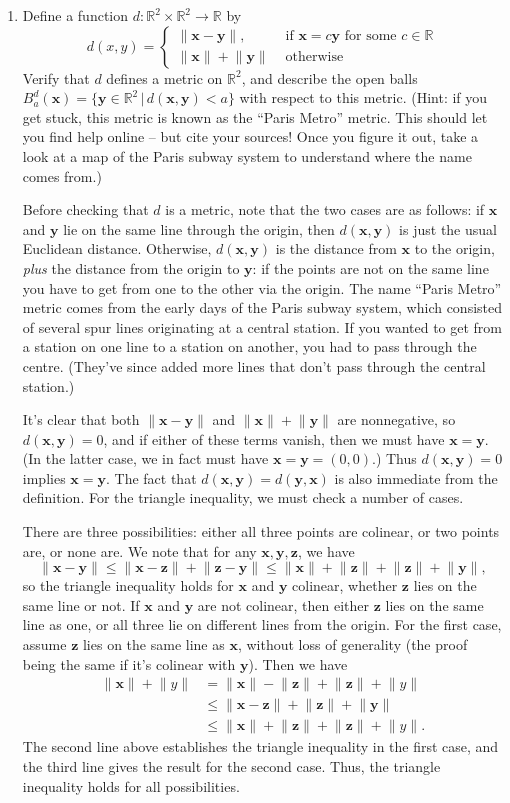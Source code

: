 \documentclass[letterpaper,12pt]{article}
\newcommand{\len}[1]{\lVert #1\rVert}
\newcommand{\R}{\mathbb{R}}
\newcommand{\x}{\mathbf{x}}
\newcommand{\y}{\mathbf{y}}
\newcommand{\z}{\mathbf{z}}
\begin{document}
\begin{enumerate}
 \item Define a function $d:\R^2\times\R^2\to \R$ by
\[
 d(x,y) = \begin{cases}
           \len{\x-\y}, & \text{ if } \x=c\y \text{ for some } c\in\R\\
           \len{\x}+\len{\y} & \text{ otherwise}
          \end{cases}
\]
Verify that $d$ defines a metric on $\R^2$, and describe the open balls $B^d_a(\x) = \{\y\in\R^2 \,|\, d(\x,\y)<a\}$ with respect to this metric. (Hint: if you get stuck, this metric is known as the ``Paris Metro'' metric. This should let you find help online -- but cite your sources! Once you figure it out, take a look at a map of the Paris subway system to understand where the name comes from.)

\bigskip

Before checking that $d$ is a metric, note that the two cases are as follows: if $\x$ and $\y$ lie on the same line through the origin, then $d(\x,\y)$ is just the usual Euclidean distance. Otherwise, $d(\x,\y)$ is the distance from $\x$ to the origin, {\em plus} the distance from the origin to $\y$: if the points are not on the same line you have to get from one to the other via the origin. The name ``Paris Metro'' metric comes from the early days of the Paris subway system, which consisted of several spur lines originating at a central station. If you wanted to get from a station on one line to a station on another, you had to pass through the centre. (They've since added more lines that don't pass through the central station.)

It's clear that both $\len{\x-\y}$ and $\len{\x}+\len{\y}$ are nonnegative, so $d(\x,\y)=0$, and if either of these terms vanish, then we must have $\x=\y$. (In the latter case, we in fact must have $\x=\y=(0,0)$.) Thus $d(\x,\y)=0$ implies $\x=\y$. The fact that $d(\x,\y)=d(\y,\x)$ is also immediate from the definition. For the triangle inequality, we must check a number of cases.

There are three possibilities: either all three points are colinear, or two points are, or none are. We note that for any $\x, \y, \z$, we have
\[
 \len{\x-\y}\leq \len{\x-\z}+\len{\z-\y}\leq \len{\x}+\len{\z}+\len{\z}+\len{\y},
\]
so the triangle inequality holds for $\x$ and $\y$ colinear, whether $\z$ lies on the same line or not. If $\x$ and $\y$ are not colinear, then either $\z$ lies on the same line as one, or all three lie on different lines from the origin. For the first case, assume $\z$ lies on the same line as $\x$, without loss of generality (the proof being the same if it's colinear with $\y$). Then we have
\begin{align*}
 \len{\x}+\len{y}  &= \len{\x}-\len{\z}+\len{\z}+\len{y}\\
&\leq \len{\x-\z}+\len{\z}+\len{\y}\\
&\leq \len{\x}+\len{\z}+\len{\z}+\len{y}.
\end{align*}
The second line above establishes the triangle inequality in the first case, and the third line gives the result for the second case. Thus, the triangle inequality holds for all possibilities.


\end{enumerate}
\end{document}
